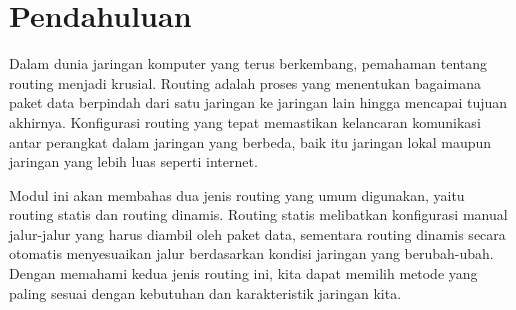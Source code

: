 \section*{Pendahuluan}

Dalam dunia jaringan komputer yang terus berkembang, pemahaman tentang routing menjadi krusial. Routing adalah proses yang menentukan bagaimana paket data berpindah dari satu jaringan ke jaringan lain hingga mencapai tujuan akhirnya. Konfigurasi routing yang tepat memastikan kelancaran komunikasi antar perangkat dalam jaringan yang berbeda, baik itu jaringan lokal maupun jaringan yang lebih luas seperti internet.

Modul ini akan membahas dua jenis routing yang umum digunakan, yaitu routing statis dan routing dinamis. Routing statis melibatkan konfigurasi manual jalur-jalur yang harus diambil oleh paket data, sementara routing dinamis secara otomatis menyesuaikan jalur berdasarkan kondisi jaringan yang berubah-ubah. Dengan memahami kedua jenis routing ini, kita dapat memilih metode yang paling sesuai dengan kebutuhan dan karakteristik jaringan kita.

